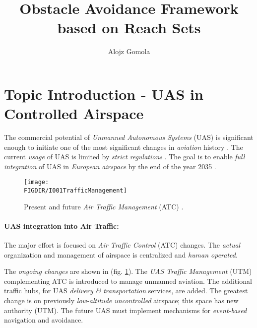 \documentclass[a4paper,narrowmargins,11pt,oneside,onehalfspaced,singlespacednotes]{fcup-thesis}
\author{Alojz Gomola}
\title{Obstacle Avoidance Framework based on Reach Sets}
\newcommand{\FIGDIR}{./Pics}    %
\theoremstyle{plain}
\theoremstyle{plain}
\theoremstyle{remark}
\begin{document}

\section*{Topic Introduction - UAS in Controlled Airspace}\label{s:motivation}
\noindent The commercial potential of \emph{Unmanned Autonomous Systems} (UAS) is significant  enough to initiate one of the most significant changes in \emph{aviation} history \cite{airbusUTM2018blueprint}. The current \emph{usage} of UAS is limited by \emph{strict regulations} \cite{icao4444,icaoAnnex2,icaoAnnex11}. The goal is to enable \emph{full integration} of UAS in \emph{European airspace} by the end of the year 2035 \cite{eurocontrol2018rpasatm}.


\begin{figure}[H]
    \centering
    \texttt{[image: \\FIGDIR/I001TrafficManagement]}
    \caption{Present and future \emph{Air Traffic Management} (ATC) \cite{airbusUTM2018blueprint}.}
    \label{fig:airTrafficManagementEvolution}
\end{figure}

\paragraph{UAS integration into Air Traffic:} The major effort is focused on \emph{Air Traffic Control} (ATC) changes. The \emph{actual} organization and management of airspace is centralized and \emph{human operated}.  

The \emph{ongoing changes} are shown in (fig. \ref{fig:airTrafficManagementEvolution}). The \emph{UAS Traffic Management} (UTM) complementing ATC is introduced to manage unmanned aviation. The additional traffic hubs, for UAS \emph{delivery \& transportation} services, are added. The greatest change is on previously \emph{low-altitude uncontrolled} airspace; this space has new authority (UTM). The future UAS must implement mechanisms for \emph{event-based} navigation and avoidance.
\end{document}
